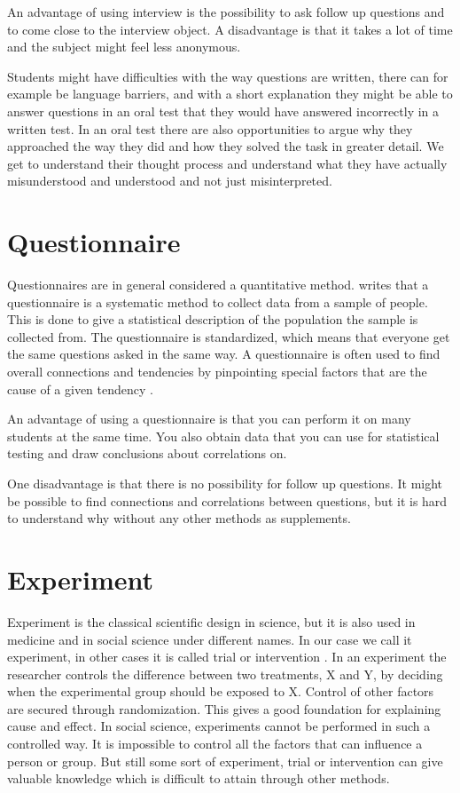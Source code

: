 \bigskip\noindent
An advantage of using interview is the possibility to ask follow up questions and to come close to the interview object.
A disadvantage is that it takes a lot of time and the subject might feel less anonymous.

\bigskip\noindent
Students might have difficulties with the way questions are written, there can for example be language barriers, and with a short explanation they might be able to answer questions in an oral test that they would have answered incorrectly in a written test. In an oral test there are also opportunities to argue why they approached the way they did and how they solved the task in greater detail. We get to understand their thought process and understand what they have actually misunderstood and understood and not just misinterpreted.  

\section{Questionnaire}
Questionnaires are in general considered a quantitative method.  writes that a questionnaire is a systematic method to collect data from a sample of people. This is done to give a statistical description of the population the sample is collected from. The questionnaire is standardized, which means that everyone get the same questions asked in the same way. A questionnaire is often used to find overall connections and tendencies by pinpointing special factors that are the cause of a given tendency \cite{tjora2012kvalitative}. 

\bigskip\noindent
An advantage of using a questionnaire is that you can perform it on many students at the same time. You also obtain data that you can use for statistical testing and draw conclusions about correlations on. 

\bigskip\noindent
One disadvantage is that there is no possibility for follow up questions. It might be possible to find connections and correlations between questions, but it is hard to understand why without any other methods as supplements.

\section{Experiment}
Experiment is the classical scientific design in science, but it is also used in medicine and in social science under different names. In our case we call it experiment, in other cases it is called trial or intervention \cite{ringdal2001enhet}. In an experiment the researcher controls the difference between two treatments, X and Y, by deciding when the experimental group should be exposed to X. Control of other factors are secured through randomization. This gives a good foundation for explaining cause and effect. In social science, experiments cannot be performed in such a controlled way. It is impossible to control all the factors that can influence a person or group. But still some sort of experiment, trial or intervention can give valuable knowledge which is difficult to attain through other methods.

